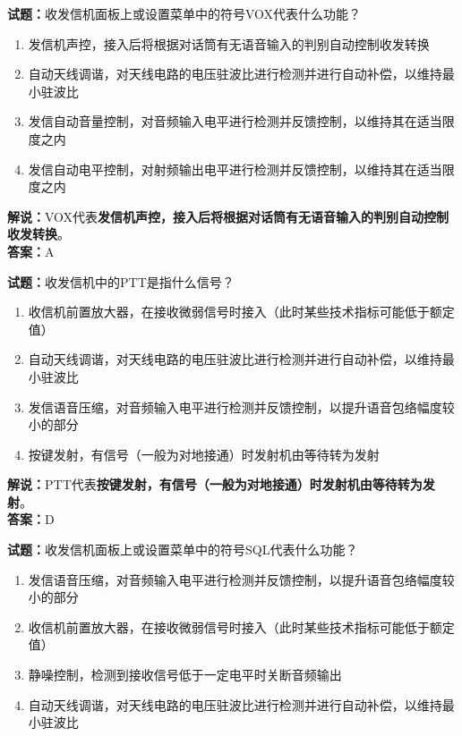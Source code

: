 \documentclass{ctexbook}
\begin{document}
\noindent\textbf{试题：}收发信机面板上或设置菜单中的符号VOX代表什么功能？

\begin{enumerate}[leftmargin=3em]
  \item 发信机声控，接入后将根据对话筒有无语音输入的判别自动控制收发转换
  \item 自动天线调谐，对天线电路的电压驻波比进行检测并进行自动补偿，以维持最小驻波比
  \item 发信自动音量控制，对音频输入电平进行检测并反馈控制，以维持其在适当限度之内
  \item 发信自动电平控制，对射频输出电平进行检测并反馈控制，以维持其在适当限度之内
\end{enumerate}

\noindent\textbf{解说：}VOX代表\textbf{发信机声控，接入后将根据对话筒有无语音输入的判别自动控制收发转换}。\\\noindent\textbf{答案：}A

\vspace{\baselineskip}

\noindent\textbf{试题：}收发信机中的PTT是指什么信号？

\begin{enumerate}[leftmargin=3em]
  \item 收信机前置放大器，在接收微弱信号时接入（此时某些技术指标可能低于额定值）
  \item 自动天线调谐，对天线电路的电压驻波比进行检测并进行自动补偿，以维持最小驻波比
  \item 发信语音压缩，对音频输入电平进行检测并反馈控制，以提升语音包络幅度较小的部分
  \item 按键发射，有信号（一般为对地接通）时发射机由等待转为发射
\end{enumerate}

\noindent\textbf{解说：}PTT代表\textbf{按键发射，有信号（一般为对地接通）时发射机由等待转为发射}。\\\noindent\textbf{答案：}D

\vspace{\baselineskip}

\noindent\textbf{试题：}收发信机面板上或设置菜单中的符号SQL代表什么功能？

\begin{enumerate}[leftmargin=3em]
  \item 发信语音压缩，对音频输入电平进行检测并反馈控制，以提升语音包络幅度较小的部分
  \item 收信机前置放大器，在接收微弱信号时接入（此时某些技术指标可能低于额定值）
  \item 静噪控制，检测到接收信号低于一定电平时关断音频输出
  \item 自动天线调谐，对天线电路的电压驻波比进行检测并进行自动补偿，以维持最小驻波比
\end{enumerate}
\end{document}
